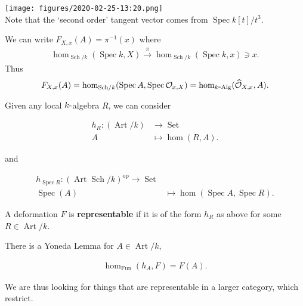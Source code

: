 \texttt{[image: figures/2020-02-25-13:20.png]}\\

Note that the `second order' tangent vector comes from
\(\operatorname{Spec}k[t]/t^3\).

We can write \(F_{X, x}(A) = \pi^{-1}(x)\) where
\begin{align*}
\hom_{{\operatorname{Sch}}/k}(\operatorname{Spec}k, X) \xrightarrow{\pi} \hom_{{\operatorname{Sch}}/k}(\operatorname{Spec}k, x) \ni x
.\end{align*}
Thus
\begin{align*}
F_{X, x}(A) = \hom_{{\operatorname{Sch}}/k}(\operatorname{Spec}A, \operatorname{Spec}{\mathcal{O}}_{x, X}) = \hom_{k{\hbox{-}}\mathrm{Alg}}(\widehat{{\mathcal{O}}}_{X, x}, A)
.\end{align*}

\begin{description}
\tightlist
\item[Example]
Given any local \(k{\hbox{-}}\)algebra \(R\), we can consider
\end{description}

\begin{align*}   h_R: (\operatorname{Art}/k) &\to {\operatorname{Set}}\\   A &\mapsto \hom(R, A)   .\end{align*}

and

\begin{align*}   h_{\operatorname{Spec}R}: (\operatorname{Art}{\operatorname{Sch}}/k)^\operatorname{op}\to {\operatorname{Set}}\\   \operatorname{Spec}(A) &\mapsto \hom(\operatorname{Spec}A, \operatorname{Spec}R)   .\end{align*}

\begin{description}
\tightlist
\item[Definition (Representable Deformations)]
A deformation \(F\) is \textbf{representable} if it is of the form
\(h_R\) as above for some \(R \in \operatorname{Art}/k\).
\item[Remark]
There is a Yoneda Lemma for \(A\in \operatorname{Art}/k\),
\end{description}

\begin{align*}   \hom_{\mathrm{Fun}}(h_A, F) = F(A)   .\end{align*}

We are thus looking for things that are representable in a larger
category, which restrict.

